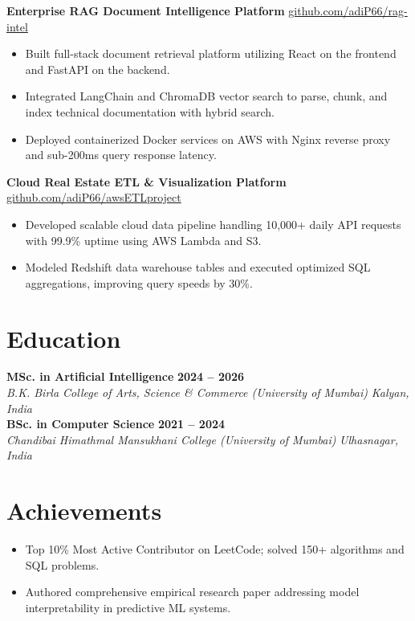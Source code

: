 \documentclass[10pt,a4paper]{article}
\begin{document}
\textbf{Enterprise RAG Document Intelligence Platform} \hfill \href{https://github.com/adiP66}{github.com/adiP66/rag-intel}
\begin{itemize}
    \item Built full-stack document retrieval platform utilizing React on the frontend and FastAPI on the backend.
    \item Integrated LangChain and ChromaDB vector search to parse, chunk, and index technical documentation with hybrid search.
    \item Deployed containerized Docker services on AWS with Nginx reverse proxy and sub-200ms query response latency.
\end{itemize}

\textbf{Cloud Real Estate ETL \& Visualization Platform} \hfill \href{https://github.com/adiP66/awsETLproject}{github.com/adiP66/awsETLproject}
\begin{itemize}
    \item Developed scalable cloud data pipeline handling 10,000+ daily API requests with 99.9\% uptime using AWS Lambda and S3.
    \item Modeled Redshift data warehouse tables and executed optimized SQL aggregations, improving query speeds by 30\%.
\end{itemize}

\section*{Education}
\textbf{MSc. in Artificial Intelligence} \hfill \textbf{2024 -- 2026} \\
\textit{B.K. Birla College of Arts, Science \& Commerce (University of Mumbai)} \hfill \textit{Kalyan, India} \\[3pt]
\textbf{BSc. in Computer Science} \hfill \textbf{2021 -- 2024} \\
\textit{Chandibai Himathmal Mansukhani College (University of Mumbai)} \hfill \textit{Ulhasnagar, India}

\section*{Achievements}
\begin{itemize}
    \item Top 10\% Most Active Contributor on LeetCode; solved 150+ algorithms and SQL problems.
    \item Authored comprehensive empirical research paper addressing model interpretability in predictive ML systems.
\end{itemize}
\end{document}

